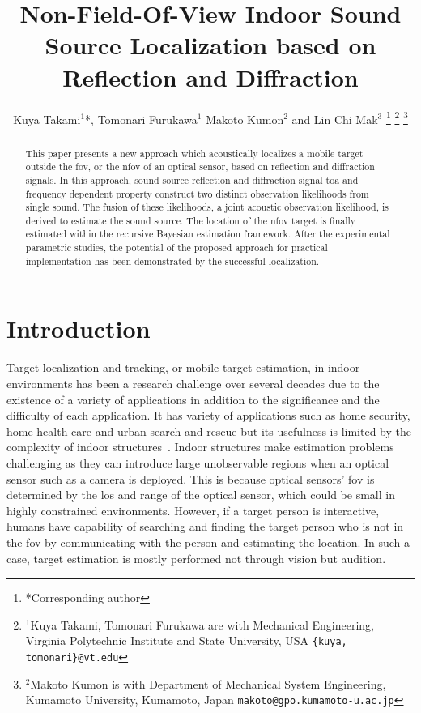 \documentclass[letterpaper, 10 pt, conference]{ieeeconf}  %
\title{\LARGE \bf
Non-Field-Of-View Indoor Sound Source Localization based on Reflection and Diffraction
}
\author{Kuya Takami$^{1}$*, Tomonari Furukawa$^{1}$ Makoto Kumon$^{2}$ and Lin Chi Mak$^{3}$%
\thanks{*Corresponding author}%
\thanks{$^{1}$Kuya Takami, Tomonari Furukawa are with Mechanical Engineering, Virginia Polytechnic Institute and State University, USA
        {\tt\small \{kuya, tomonari\}@vt.edu}}
\thanks{$^{2}$Makoto Kumon is with Department of Mechanical System Engineering, Kumamoto University, Kumamoto, Japan
        {\tt\small makoto@gpo.kumamoto-u.ac.jp}}}
\begin{document}
\maketitle
\thispagestyle{empty}
\pagestyle{empty}
\begin{abstract}
This paper presents a new approach which acoustically localizes a mobile target outside the \gls{fov}, or the \gls{nfov} of an optical sensor, based on reflection and diffraction signals. In this approach, sound source reflection and diffraction signal \gls{toa} and frequency dependent property construct two distinct observation likelihoods from single sound. The fusion of these likelihoods, a joint acoustic observation likelihood, is derived to estimate the sound source. The location of the \gls{nfov} target is finally estimated within the recursive Bayesian estimation framework.  After the experimental parametric studies, the potential of the proposed approach for practical implementation has been demonstrated by the successful localization.
\end{abstract}
\section{Introduction}
Target localization and tracking, or mobile target estimation, in indoor environments has been a research challenge over several decades due to the existence of a variety of applications in addition to the significance and the difficulty of each application. It has variety of applications such as home security, home health care and urban search-and-rescue but its usefulness is limited by the complexity of indoor structures~\cite{priyantha2005mobile,Khoury2009,argentieri2014survey}. Indoor structures make estimation problems challenging as they can introduce large unobservable regions when an optical sensor such as a camera is deployed.  This is because optical sensors' \acrfull{fov} is determined by the \gls{los} and range of the optical sensor, which could be small in highly constrained environments. However, if a target person is interactive, humans have capability of searching and finding the target person who is not in the \gls{fov} by communicating with the person and estimating the location. In such a case, target estimation is mostly performed not through vision but audition. 
\end{document}
